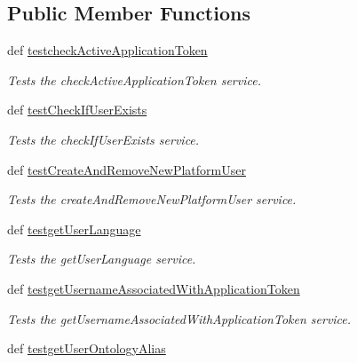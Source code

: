 \subsection*{Public Member Functions}
\begin{DoxyCompactItemize}
\item 
def \hyperlink{classrapp__mysql__wrapper__functional__tests_1_1TestDbWrapper_a893cbe462e5931038d6973ea8a232231}{testcheck\-Active\-Application\-Token}
\begin{DoxyCompactList}\small\item\em Tests the check\-Active\-Application\-Token service. \end{DoxyCompactList}\item 
def \hyperlink{classrapp__mysql__wrapper__functional__tests_1_1TestDbWrapper_a16edd623cabd6c50006d1261dd0b21fb}{test\-Check\-If\-User\-Exists}
\begin{DoxyCompactList}\small\item\em Tests the check\-If\-User\-Exists service. \end{DoxyCompactList}\item 
def \hyperlink{classrapp__mysql__wrapper__functional__tests_1_1TestDbWrapper_ae1dc11541b93e90d81066de2651e0f16}{test\-Create\-And\-Remove\-New\-Platform\-User}
\begin{DoxyCompactList}\small\item\em Tests the create\-And\-Remove\-New\-Platform\-User service. \end{DoxyCompactList}\item 
def \hyperlink{classrapp__mysql__wrapper__functional__tests_1_1TestDbWrapper_ac604aa732d3ad4ee6e711131dd2eed3f}{testget\-User\-Language}
\begin{DoxyCompactList}\small\item\em Tests the get\-User\-Language service. \end{DoxyCompactList}\item 
def \hyperlink{classrapp__mysql__wrapper__functional__tests_1_1TestDbWrapper_a1b256178e3234013dab12861b60cebcf}{testget\-Username\-Associated\-With\-Application\-Token}
\begin{DoxyCompactList}\small\item\em Tests the get\-Username\-Associated\-With\-Application\-Token service. \end{DoxyCompactList}\item 
def \hyperlink{classrapp__mysql__wrapper__functional__tests_1_1TestDbWrapper_a9a85f2a416ecaed5fbb1efdcdb51e7a8}{testget\-User\-Ontology\-Alias}

\end{DoxyCompactItemize}
